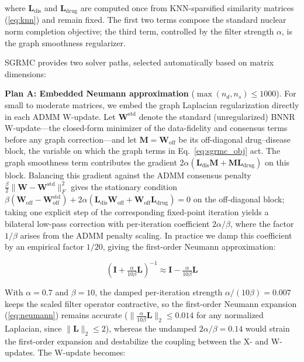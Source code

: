 \documentclass[webpdf,modern,large]{oup-authoring-template}
\begin{document}
where $\mathbf{L}_{\text{dis}}$ and $\mathbf{L}_{\text{drug}}$ are computed once from KNN-sparsified similarity matrices (\eqref{eq:knn}) and remain fixed. The first two terms compose the standard nuclear norm completion objective; the third term, controlled by the filter strength $\alpha$, is the graph smoothness regularizer.

SGRMC provides two solver paths, selected automatically based on matrix dimensions:

\noindent\textbf{Plan A: Embedded Neumann approximation} ($\max(n_d, n_s) \le 1000$).\enspace
For small to moderate matrices, we embed the graph Laplacian regularization directly in each ADMM W-update. Let $\mathbf{W}^{\text{std}}$ denote the standard (unregularized) BNNR W-update---the closed-form minimizer of the data-fidelity and consensus terms before any graph correction---and let $\mathbf{M} = \mathbf{W}_{\text{off}}$ be its off-diagonal drug--disease block, the variable on which the graph terms in Eq.~\eqref{eq:sgrmc_obj} act. The graph smoothness term contributes the gradient $2\alpha(\mathbf{L}_{\text{dis}}\mathbf{M} + \mathbf{M}\mathbf{L}_{\text{drug}})$ on this block. Balancing this gradient against the ADMM consensus penalty $\tfrac{\beta}{2}\|\mathbf{W} - \mathbf{W}^{\text{std}}\|_F^2$ gives the stationary condition $\beta(\mathbf{W}_{\text{off}} - \mathbf{W}_{\text{off}}^{\text{std}}) + 2\alpha(\mathbf{L}_{\text{dis}}\mathbf{W}_{\text{off}} + \mathbf{W}_{\text{off}}\mathbf{L}_{\text{drug}}) = 0$ on the off-diagonal block; taking one explicit step of the corresponding fixed-point iteration yields a bilateral low-pass correction with per-iteration coefficient $2\alpha/\beta$, where the factor $1/\beta$ arises from the ADMM penalty scaling. In practice we damp this coefficient by an empirical factor $1/20$, giving the first-order Neumann approximation:

\begin{equation}
(\mathbf{I} + \tfrac{\alpha}{10\beta}\mathbf{L})^{-1} \approx \mathbf{I} - \tfrac{\alpha}{10\beta}\mathbf{L}
\label{eq:neumann}
\end{equation}

With $\alpha = 0.7$ and $\beta = 10$, the damped per-iteration strength $\alpha/(10\beta) = 0.007$ keeps the scaled filter operator contractive, so the first-order Neumann expansion (\eqref{eq:neumann}) remains accurate ($\|\tfrac{\alpha}{10\beta}\mathbf{L}\|_2 \le 0.014$ for any normalized Laplacian, since $\|\mathbf{L}\|_2 \le 2$), whereas the undamped $2\alpha/\beta = 0.14$ would strain the first-order expansion and destabilize the coupling between the X- and W-updates. The W-update becomes:
\end{document}
